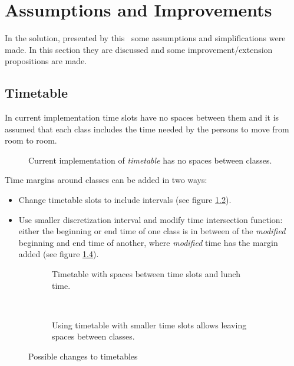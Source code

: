 \documentclass[header]{subfiles}
\providecommand{\rootdir}{.}
\begin{document}
\chapter{ Assumptions and Improvements }
\label{chapter:improvements}

In the solution, presented by this \thisdoc\ some assumptions and
simplifications were made. In this section they are discussed and some
improvement/extension propositions are made.

\section{Timetable}
In current implementation time slots have no spaces between them and it is
assumed that each class includes the time needed by the persons to
move from room to room.

\begin{figure}[h]
  \centering
  
  \caption[Current timetables implementation]
          {Current implementation of \emph{timetable} has
           no spaces between classes. }
  \label{fig:timetable-current}
\end{figure}


\medskip\noindent
Time margins around classes can be added in two ways:
\begin{itemize}
  \item Change timetable slots to include intervals
        (see figure \ref{fig:timetable-intervals-predef}).

  \item Use smaller discretization interval and modify time intersection function:
        either the beginning or end time of one class is in between of
        the \emph{modified} beginning and end time of another,
        where \emph{modified} time has the margin added
        (see figure \ref{fig:timetable-intervals-any}).
\end{itemize}

\begin{figure}[h]
  \begin{subfigure}[b]{.5\textwidth}
    \centering
    
    \caption{Timetable with spaces between time slots and lunch time.}
    \label{fig:timetable-intervals-predef}
  \end{subfigure}
  ~
  \begin{subfigure}[b]{.5\textwidth}
    \centering
    
    \caption{Using timetable with smaller time slots allows leaving spaces
             between classes.}
    \label{fig:timetable-intervals-any}
  \end{subfigure}
  \caption{Possible changes to timetables}
\end{figure}
\end{document}
